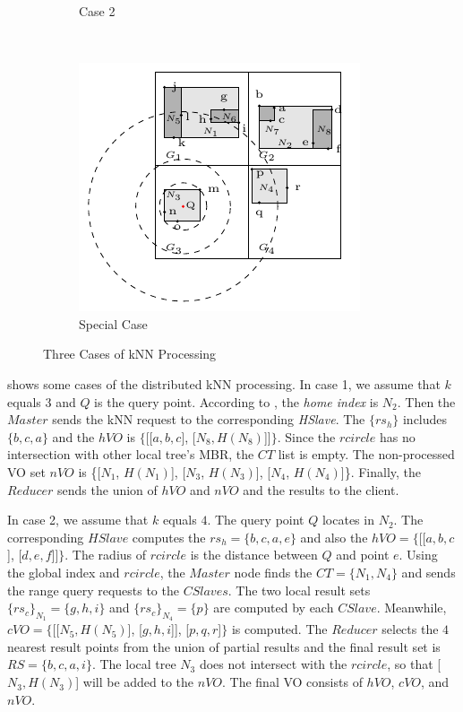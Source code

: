 \begin{figure}[t]
\begin{subfigure}[b]{.33\linewidth}
    \caption{Case 2}\label{fig:knn:cases:case2}
  \end{subfigure}~%
  \begin{subfigure}[b]{.313\linewidth}
    \centering
    \includegraphics[width=\linewidth]{figs/knn/specialcase.pdf}
    \caption{Special Case}\label{fig:knn:cases:specialcase}
  \end{subfigure}
  \caption{Three Cases of {kNN} Processing}\label{fig:knn:cases}
\end{figure}

 shows some cases of the distributed kNN processing. In case 1, we assume that $k$ equals $3$ and $Q$ is the query point. According to , the \emph{home index} is $N_{2}$. Then the $Master$ sends the kNN request to the corresponding \emph{HSlave}. The $\{rs_{h}\}$ includes $\{b, c, a\}$ and the $hVO$ is $\{$[[$a, b, c$], [$N_{8}, H(N_{8})$]]$\}$. Since the $rcircle$ has no intersection with other local tree's MBR, the $CT$ list is empty. The non-processed VO set $nVO$ is \{[$N_{1}$, $H(N_{1})$], [$N_{3}$, $H(N_{3})$], [$N_{4}$, $H(N_{4})$]\}. Finally, the $Reducer$ sends the union of $hVO$ and $nVO$ and the results to the client.

In case 2, we assume that $k$ equals $4$. The query point $Q$ locates in $N_{2}$. The corresponding $HSlave$ computes the $rs_{h}=\{b, c, a, e\}$ and also the $hVO=\{$[[$a, b, c$], [$d, e, f$]]$\}$. The radius of $rcircle$ is the distance between $Q$ and point $e$. Using the global index and $rcircle$, the $Master$ node finds the $CT=\{N_{1}, N_{4}\}$ and sends the range query requests to the $CSlaves$. The two local result sets ${\{rs_{c}\}}_{N_{1}}=\{g, h, i\}$ and ${\{rs_{c}\}}_{N_{4}}=\{p\}$ are computed by each $CSlave$. Meanwhile, $cVO=\{$[[$N_{5}, H(N_{5})$], [$g, h, i$]], [$p, q, r$]$\}$ is computed. The $Reducer$ selects the $4$ nearest result points from the union of partial results and the final result set is $RS=\{b, c, a, i\}$. The local tree $N_{3}$ does not intersect with the $rcircle$, so that [$N_{3}, H(N_{3})$] will be added to the $nVO$. The final VO consists of $hVO$, $cVO$, and $nVO$.

